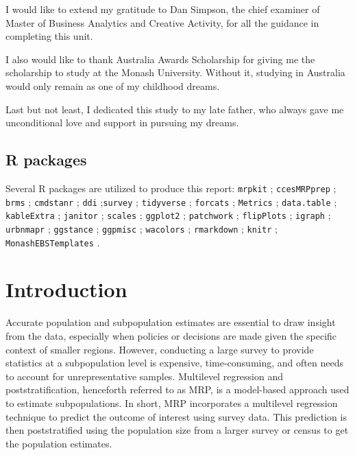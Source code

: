 \documentclass{monashthesis}
\begin{document}
I would like to extend my gratitude to Dan Simpson, the chief examiner of Master of Business Analytics and Creative Activity, for all the guidance in completing this unit.

I also would like to thank Australia Awards Scholarship for giving me the scholarship to study at the Monash University. Without it, studying in Australia would only remain as one of my childhood dreams.

Last but not least, I dedicated this study to my late father, who always gave me unconditional love and support in pursuing my dreams.

\hypertarget{r-packages}{%
\section*{R packages}\label{r-packages}}

Several R \autocite{R} packages are utilized to produce this report: \texttt{mrpkit} \autocite{mrpkit}; \texttt{ccesMRPprep} \autocite{ccesmrpprep}; \texttt{brms} \autocite{brms}; \texttt{cmdstanr} \autocite{cmdstanr}; \texttt{ddi} \autocite{ddi};\texttt{survey} \autocite{survey}; \texttt{tidyverse} \autocite{tidyverse}; \texttt{forcats} \autocite{forcats}; \texttt{Metrics} \autocite{Metrics}; \texttt{data.table} \autocite{datatable}; \texttt{kableExtra} \autocite{kable}; \texttt{janitor} \autocite{janitor}; \texttt{scales} \autocite{scales}; \texttt{ggplot2} \autocite{ggplot2}; \texttt{patchwork} \autocite{pw}; \texttt{flipPlots} \autocite{flipflops}; \texttt{igraph} \autocite{igraph}; \texttt{urbnmapr} \autocite{urban}; \texttt{ggstance} \autocite{stance}; \texttt{ggpmisc} \autocite{ggpmisc}; \texttt{wacolors} \autocite{wacolors}; \texttt{rmarkdown} \autocite{rmd}; \texttt{knitr} \autocite{knitr}; \texttt{MonashEBSTemplates} \autocite{monashtemp}.

\hypertarget{ch:intro}{%
\chapter{Introduction}\label{ch:intro}}

Accurate population and subpopulation estimates are essential to draw insight from the data, especially when policies or decisions are made given the specific context of smaller regions. However, conducting a large survey to provide statistics at a subpopulation level is expensive, time-consuming, and often needs to account for unrepresentative samples. Multilevel regression and poststratification, henceforth referred to as MRP, is a model-based approach used to estimate subpopulations. In short, MRP incorporates a multilevel regression technique to predict the outcome of interest using survey data. This prediction is then poststratified using the population size from a larger survey or census to get the population estimates.
\end{document}
